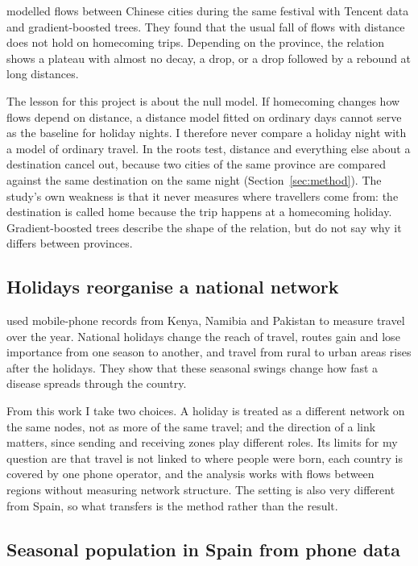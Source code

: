 \citet{luan2024different} modelled flows between Chinese cities during the same festival with Tencent data and gradient-boosted trees. They found that the usual fall of flows with distance does not hold on homecoming trips. Depending on the province, the relation shows a plateau with almost no decay, a drop, or a drop followed by a rebound at long distances.

The lesson for this project is about the null model. If homecoming changes how flows depend on distance, a distance model fitted on ordinary days cannot serve as the baseline for holiday nights. I therefore never compare a holiday night with a model of ordinary travel. In the roots test, distance and everything else about a destination cancel out, because two cities of the same province are compared against the same destination on the same night (Section~\ref{sec:method}). The study's own weakness is that it never measures where travellers come from: the destination is called home because the trip happens at a homecoming holiday. Gradient-boosted trees describe the shape of the relation, but do not say why it differs between provinces.

\subsection{Holidays reorganise a national network}

\citet{wesolowski2017seasonal} used mobile-phone records from Kenya, Namibia and Pakistan to measure travel over the year. National holidays change the reach of travel, routes gain and lose importance from one season to another, and travel from rural to urban areas rises after the holidays. They show that these seasonal swings change how fast a disease spreads through the country.

From this work I take two choices. A holiday is treated as a different network on the same nodes, not as more of the same travel; and the direction of a link matters, since sending and receiving zones play different roles. Its limits for my question are that travel is not linked to where people were born, each country is covered by one phone operator, and the analysis works with flows between regions without measuring network structure. The setting is also very different from Spain, so what transfers is the method rather than the result.

\subsection{Seasonal population in Spain from phone data}

